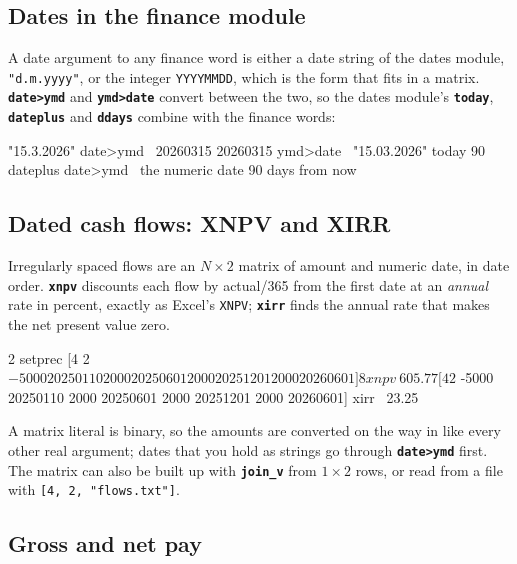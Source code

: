 \documentclass[11pt,letterpaper]{article}
\newcommand{\code}[1]{\texttt{#1}}
\newcommand{\cmd}[1]{\texttt{\textbf{#1}}}
\begin{document}
\subsection{Dates in the finance module}
\label{sec:findates}

A date argument to any finance word is either a date string of the dates module, \code{"d.m.yyyy"}, or the integer \code{YYYYMMDD}, which is the form that fits in a matrix. \cmd{date>ymd} and \cmd{ymd>date} convert between the two, so the dates module's \cmd{today}, \cmd{dateplus} and \cmd{ddays} combine with the finance words:
\begin{rpn}
"15.3.2026" date>ymd       \ 20260315
20260315 ymd>date          \ "15.03.2026"
today 90 dateplus date>ymd \ the numeric date 90 days from now
\end{rpn}

\subsection{Dated cash flows: XNPV and XIRR}

Irregularly spaced flows are an $N\times 2$ matrix of amount and numeric date, in date order. \cmd{xnpv} discounts each flow by actual/365 from the first date at an \emph{annual} rate in percent, exactly as Excel's \code{XNPV}; \cmd{xirr} finds the annual rate that makes the net present value zero.
\begin{rpn}
2 setprec
[4 2 $ -5000 20250110  2000 20250601  2000 20251201  2000 20260601] 8 xnpv   \ 605.77
[4 2 $ -5000 20250110  2000 20250601  2000 20251201  2000 20260601] xirr     \ 23.25
\end{rpn}
A matrix literal is binary, so the amounts are converted on the way in like every other real argument; dates that you hold as strings go through \cmd{date>ymd} first. The matrix can also be built up with \cmd{join\_v} from $1\times 2$ rows, or read from a file with \code{[4, 2, "flows.txt"]}.

\subsection{Gross and net pay}
\label{sec:salary}
\end{document}
